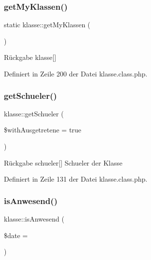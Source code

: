 \mbox{\label{classklasse_a00cc961e6c8fdaf750d00c2f5ccf75ff}} 
\subsubsection{\texorpdfstring{get\+My\+Klassen()}{getMyKlassen()}}
{\footnotesize\ttfamily static klasse\+::get\+My\+Klassen (\begin{DoxyParamCaption}{ }\end{DoxyParamCaption})\hspace{0.3cm}{\ttfamily [static]}}

\begin{DoxyReturn}{Rückgabe}
klasse\mbox{[}\mbox{]} 
\end{DoxyReturn}


Definiert in Zeile 200 der Datei klasse.\+class.\+php.

\mbox{\label{classklasse_a4124b99ceefa3c8ebc1c79bd0e372a13}} 
\subsubsection{\texorpdfstring{get\+Schueler()}{getSchueler()}}
{\footnotesize\ttfamily klasse\+::get\+Schueler (\begin{DoxyParamCaption}\item[{}]{\$with\+Ausgetretene = {\ttfamily true} }\end{DoxyParamCaption})}

\begin{DoxyReturn}{Rückgabe}
schueler\mbox{[}\mbox{]} Schueler der Klasse 
\end{DoxyReturn}


Definiert in Zeile 131 der Datei klasse.\+class.\+php.

\mbox{\label{classklasse_affa96d5d08f8c766aa72421026f90a46}} 
\subsubsection{\texorpdfstring{is\+Anwesend()}{isAnwesend()}}
{\footnotesize\ttfamily klasse\+::is\+Anwesend (\begin{DoxyParamCaption}\item[{}]{\$date = {\ttfamily \textquotesingle{}\textquotesingle{}} }\end{DoxyParamCaption})}


